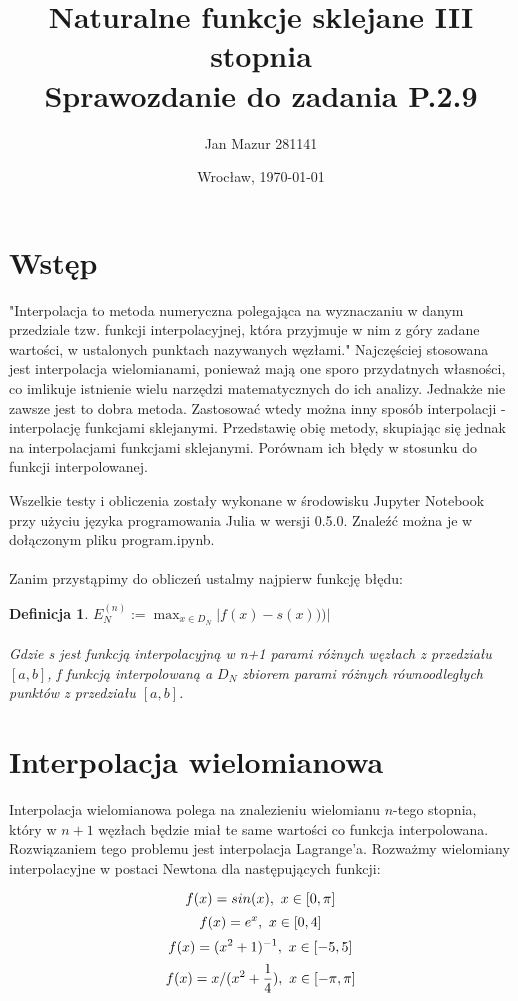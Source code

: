 \documentclass{article}
\author{Jan Mazur 281141}
\date{Wrocław, \today}
\title{\textbf{Naturalne funkcje sklejane III stopnia} \\ Sprawozdanie do zadania P.2.9	}
\newtheorem{defi}{Definicja}
\begin{document}
\maketitle

\section{Wstęp}

"Interpolacja to metoda numeryczna polegająca na wyznaczaniu w danym przedziale tzw. funkcji interpolacyjnej, która przyjmuje w nim z góry zadane wartości, w ustalonych punktach nazywanych węzłami." \cite{wikipedia_pl}
Najczęściej stosowana jest interpolacja wielomianami, ponieważ  mają one sporo przydatnych własności, co imlikuje istnienie wielu narzędzi matematycznych do ich analizy. Jednakże nie zawsze jest to dobra metoda.
Zastosować wtedy można inny sposób interpolacji - interpolację funkcjami sklejanymi.
Przedstawię obię metody, skupiając się jednak na interpolacjami funkcjami sklejanymi. Porównam ich błędy w stosunku do funkcji interpolowanej.

Wszelkie testy i obliczenia zostały wykonane w środowisku Jupyter Notebook przy użyciu języka programowania Julia w wersji 0.5.0.
Znaleźć można je w dołączonym pliku program.ipynb.\\\\
\noindent
Zanim przystąpimy do obliczeń ustalmy najpierw funkcję błędu:

\begin{defi}
	$E_N^{(n)} := \max_{x \in D_N}|f(x)-s(x)))|$ \\
	\\
	Gdzie s jest funkcją interpolacyjną w n+1 parami różnych węzłach z przedziału $[a,b]$, f funkcją interpolowaną a $D_N$ zbiorem parami różnych równoodległych punktów z przedziału $[a,b]$.
\end{defi}



\section{Interpolacja wielomianowa}
Interpolacja wielomianowa polega na znalezieniu wielomianu $n$-tego stopnia, który w $n+1$ węzłach będzie miał te same wartości co funkcja interpolowana. Rozwiązaniem tego problemu jest interpolacja Lagrange'a. Rozważmy wielomiany interpolacyjne w postaci Newtona dla następujących funkcji:

\begin{equation}\label{fun1}
	f(x) = sin(x), \textnormal{ } x \in [0,\pi]
\end{equation}
\begin{equation}\label{fun2}
	f(x) = e^x, \textnormal{ } x \in [0,4]
\end{equation}
\begin{equation}\label{fun3}
	f(x) = (x^{2}+1)^{-1}, \textnormal{ } x \in [-5,5]
\end{equation}
\begin{equation}\label{fun4}
	f(x) = x/(x^{2} + \frac{1}{4}), \textnormal{ } x \in [-\pi,\pi]
\end{equation}
\end{document}
